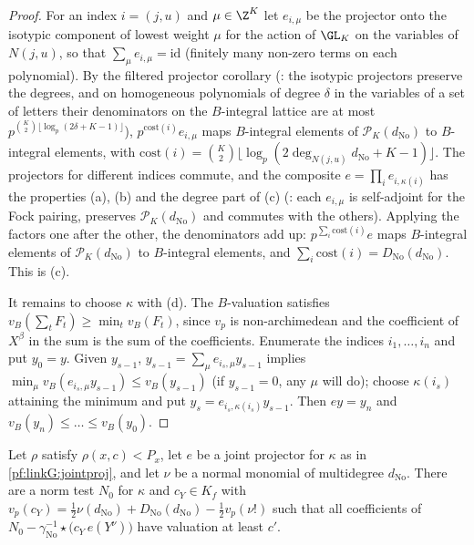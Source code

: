 \begin{proof}
For an index $i=(j,u)$ and $\mu\in\Z^K$ let $e_{i,\mu}$ be the projector onto the isotypic component of lowest weight $\mu$ for the
action of $\GL_K$ on the variables of $N(j,u)$, so that $\sum_\mu e_{i,\mu}=\mathrm{id}$ (finitely many non-zero terms on each
polynomial). By the filtered projector corollary
(: the isotypic projectors preserve the
degrees, and on homogeneous polynomials of degree $\delta$ in the variables of a set of letters their denominators on the
$B$-integral lattice are at most $p^{\binom K2\lfloor\log_p(2\delta+K-1)\rfloor}$), $p^{\mathrm{cost}(i)}e_{i,\mu}$ maps $B$-integral elements of
$\mathcal P_K(d_{\mathrm{No}})$ to $B$-integral elements, with $\mathrm{cost}(i)=\binom K2\lfloor\log_p(2\deg_{N(j,u)}d_{\mathrm{No}}+K-1)\rfloor$. The
projectors for different indices commute, and the composite $e=\prod_ie_{i,\kappa(i)}$ has the properties (a), (b) and the degree
part of (c) (: each $e_{i,\mu}$ is self-adjoint for the Fock pairing,
preserves $\mathcal P_K(d_{\mathrm{No}})$ and commutes with the others). Applying the factors one after the other, the denominators add
up: $p^{\sum_i\mathrm{cost}(i)}e$ maps $B$-integral elements of $\mathcal P_K(d_{\mathrm{No}})$ to $B$-integral elements, and
$\sum_i\mathrm{cost}(i)=D_{\mathrm{No}}(d_{\mathrm{No}})$. This is (c).

It remains to choose $\kappa$ with (d). The $B$-valuation satisfies $v_B(\sum_tF_t)\ge\min_tv_B(F_t)$, since $v_p$ is non-archimedean
and the coefficient of $X^\beta$ in the sum is the sum of the coefficients. Enumerate the indices $i_1,\dots,i_n$ and put $y_0=y$.
Given $y_{s-1}$, $y_{s-1}=\sum_\mu e_{i_s,\mu}y_{s-1}$ implies $\min_\mu v_B(e_{i_s,\mu}y_{s-1})\le v_B(y_{s-1})$ (if $y_{s-1}=0$, any $\mu$ will
do); choose $\kappa(i_s)$ attaining the minimum and put $y_s=e_{i_s,\kappa(i_s)}y_{s-1}$. Then $ey=y_n$ and
$v_B(y_n)\le\dots\le v_B(y_0)$.
\end{proof}

\begin{lemma}\label{pf:linkG:normtest}
Let $\rho$ satisfy $\rho(x,c)<P_x$, let $e$ be a joint projector for $\kappa$ as in \cref{pf:linkG:jointproj}, and let $\nu$ be a normal
monomial of multidegree $d_{\mathrm{No}}$. There are a norm test $N_0$ for $\kappa$ and $c_Y\in K_f$ with
$v_p(c_Y)=\frac12\nu(d_{\mathrm{No}})+D_{\mathrm{No}}(d_{\mathrm{No}})-\frac12v_p(\nu!)$ such that all coefficients of
$N_0-\gamma_{\mathrm{No}}^{-1}\star\bigl(c_Y\,e(Y^\nu)\bigr)$ have valuation at least $c'$.
\end{lemma}

